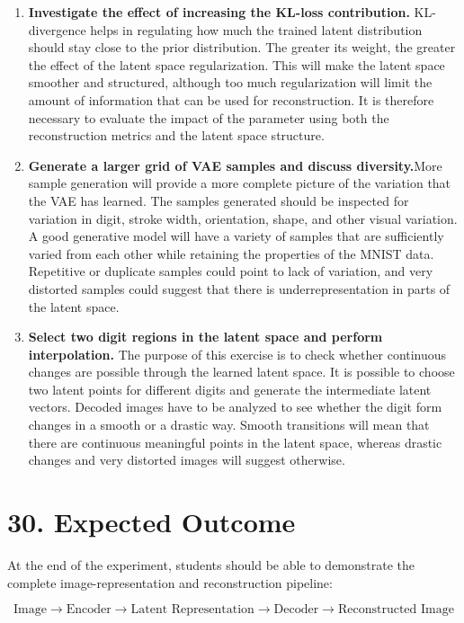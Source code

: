 \documentclass[10pt]{article}
\begin{document}
\begin{enumerate}
\item \textbf{Investigate the effect of increasing the KL-loss contribution.}
KL-divergence helps in regulating how much the trained latent distribution should stay close to the prior distribution. The greater its weight, the greater the effect of the latent space regularization. This will make the latent space smoother and structured, although too much regularization will limit the amount of information that can be used for reconstruction. It is therefore necessary to evaluate the impact of the parameter using both the reconstruction metrics and the latent space structure.
\item \textbf{Generate a larger grid of VAE samples and discuss diversity.}More sample generation will provide a more complete picture of the variation that the VAE has learned. The samples generated should be inspected for variation in digit, stroke width, orientation, shape, and other visual variation. A good generative model will have a variety of samples that are sufficiently varied from each other while retaining the properties of the MNIST data. Repetitive or duplicate samples could point to lack of variation, and very distorted samples could suggest that there is underrepresentation in parts of the latent space.

\item \textbf{Select two digit regions in the latent space and perform interpolation.}
The purpose of this exercise is to check whether continuous changes are possible through the learned latent space. It is possible to choose two latent points for different digits and generate the intermediate latent vectors. Decoded images have to be analyzed to see whether the digit form changes in a smooth or a drastic way. Smooth transitions will mean that there are continuous meaningful points in the latent space, whereas drastic changes and very distorted images will suggest otherwise.

\end{enumerate}
\section*{30. Expected Outcome}

At the end of the experiment, students should be able to demonstrate the
complete image-representation and reconstruction pipeline:

\[
\boxed{
\text{Image}
\rightarrow
\text{Encoder}
\rightarrow
\text{Latent Representation}
\rightarrow
\text{Decoder}
\rightarrow
\text{Reconstructed Image}
}
\]
\end{document}
